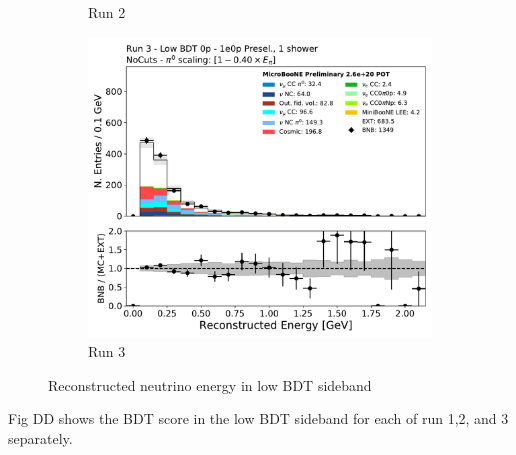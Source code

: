 \begin{figure}[H]
\begin{subfigure}{0.3\textwidth}
    \caption{Run 2}
    \end{subfigure}
    \begin{subfigure}{0.3\textwidth}
    \includegraphics[width=1.0\textwidth]{1e0p/Low_BDT_Sideband/run3/reco_e.pdf}
    \caption{Run 3}
    \end{subfigure}
    \caption{Reconstructed neutrino energy in low BDT sideband} 
    \label{fig:low_0pbdt_sideband_plots}
\end{figure}

Fig DD shows the BDT score in the low BDT sideband for each of run 1,2, and 3 separately. 

